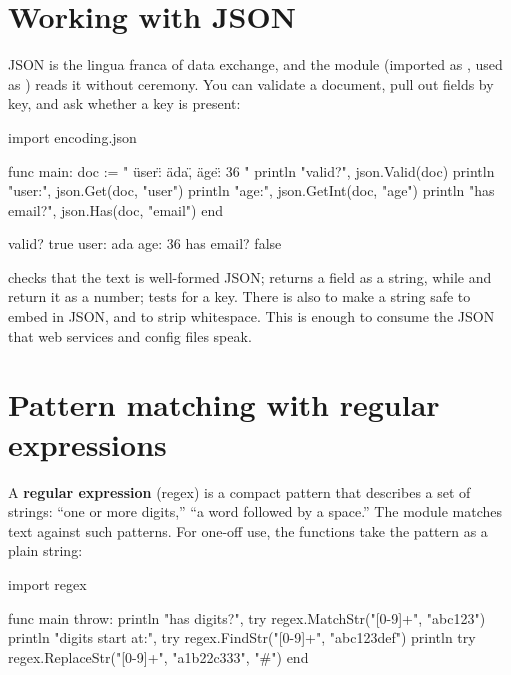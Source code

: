 \section{Working with JSON}

JSON is the lingua franca of data exchange, and the  module
(imported as , used as ) reads it
without ceremony. You can validate a document, pull out fields by key, and ask
whether a key is present:

\begin{salamen}
import encoding.json

func main:
    doc := "{ \"user\": \"ada\", \"age\": 36 }"
    println "valid?", json.Valid(doc)
    println "user:", json.Get(doc, "user")
    println "age:", json.GetInt(doc, "age")
    println "has email?", json.Has(doc, "email")
end
\end{salamen}

\begin{progout}
valid? true
user: ada
age: 36
has email? false
\end{progout}

 checks that the text is well-formed JSON;  returns
a field as a string, while  and  return it as
a number;  tests for a key. There is also  to make
a string safe to embed in JSON, and  to strip whitespace. This is
enough to consume the JSON that web services and config files speak.

\section{Pattern matching with regular expressions}

A \textbf{regular expression} (regex) is a compact pattern that describes a set of
strings: ``one or more digits,'' ``a word followed by a space.'' The
 module matches text against such patterns. For one-off use, the
 functions take the pattern as a plain string:

\begin{salamen}
import regex

func main throw:
    println "has digits?", try regex.MatchStr("[0-9]+", "abc123")
    println "digits start at:", try regex.FindStr("[0-9]+", "abc123def")
    println try regex.ReplaceStr("[0-9]+", "a1b22c333", "#")
end
\end{salamen}

